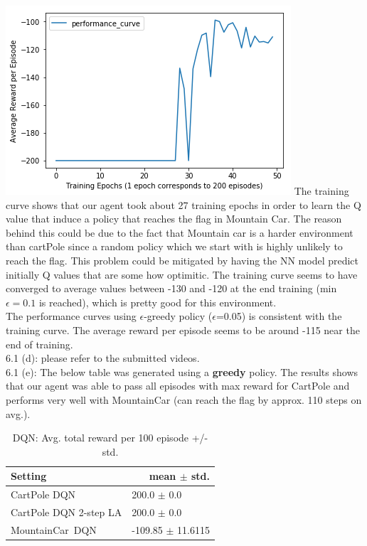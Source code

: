 \documentclass[12pt]{article}
\begin{document}
\begin{tcolorbox}[fit,height=22cm, width=\textwidth, blank, borderline={1pt}{-2pt},nobeforeafter]
    \includegraphics[width=.5\textwidth]{figures/MC_dqn_performance_curve}
	The training curve shows that our agent took about 27 training epochs in order to learn the Q value that induce a policy that reaches the flag in Mountain Car. The reason behind this could be due to the fact that Mountain car is a harder environment than cartPole since a random policy which we start with is highly unlikely to reach the flag. This problem could be mitigated by having the NN model predict initially Q values that are some how optimitic. The training curve seems to have converged to average values between -130 and -120 at the end training (min $\epsilon=0.1$ is reached), which is pretty good for this environment.  \\
	The performance curves using $\epsilon$-greedy policy ($\epsilon$=0.05) is consistent with the training curve. The average reward per episode seems to be around -115 near the end of training.   \\
	{\large 6.1 (d):} please refer to the submitted videos. \\
	{\large 6.1 (e):} The below table was generated using a \textbf{greedy} policy. The results shows that our agent was able to pass all episodes with max reward for CartPole and performs very well with $  $MountainCar (can reach the flag by approx. 110 steps on avg.).
	\vspace*{-0.6cm}
    \begin{table}[H]
	\centering
	\caption{ \small DQN: Avg. total reward per 100 episode +/- std.}
	\vspace*{-0.3cm}
	\begin{tabular}{|p{13em}|r|}
		\hline
		\textbf{\footnotesize Setting} & \multicolumn{1}{p{10.645em}|}{\textbf{ \footnotesize mean $\pm$ std.}} \\
		\hline
		{\footnotesize CartPole DQN} & \multicolumn{1}{l|}{200.0 $\pm$ 0.0} \\
		\hline
		{\footnotesize CartPole DQN 2-step LA} & \multicolumn{1}{l|}{200.0 $\pm$ 0.0} \\
		\hline
		{\footnotesize MountainCar DQN} & \multicolumn{1}{l|}{-109.85 $\pm$ 11.6115} \\
		\hline
	\end{tabular}%
	\label{tabDQN}%
	\end{table}%
	

	
	
    \end{tcolorbox}
\end{document}
